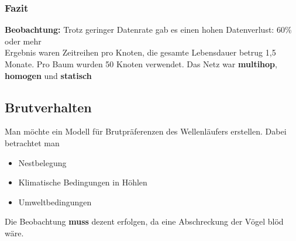 \documentclass[a4paper]{article}
\begin{document}
\subsubsection{Fazit}
\textbf{Beobachtung:} Trotz geringer Datenrate gab es einen hohen Datenverlust: 60\%  oder mehr\\

Ergebnis waren Zeitreihen pro Knoten, die gesamte Lebensdauer betrug 1,5 Monate. Pro Baum wurden 50 Knoten verwendet. Das Netz war \textbf{multihop}, \textbf{homogen} und \textbf{statisch}

\subsection{Brutverhalten}
Man möchte ein Modell für Brutpräferenzen des Wellenläufers erstellen. Dabei betrachtet man
\begin{itemize}
	\item Nestbelegung
	\item Klimatische Bedingungen in Höhlen
	\item Umweltbedingungen
\end{itemize}	
Die Beobachtung \textbf{muss} dezent erfolgen, da eine Abschreckung der Vögel blöd wäre.
	
\end{document}
